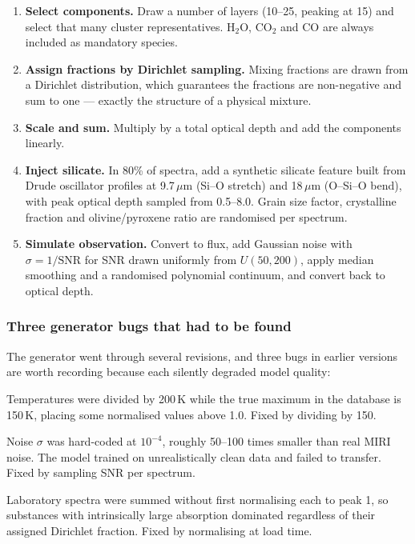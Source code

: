 \documentclass[11pt,a4paper]{article}
\newcommand{\um}{\,$\mu$m}
\newcommand{\htwoo}{H$_2$O}
\newcommand{\cotwo}{CO$_2$}
\begin{document}
\begin{enumerate}
  \item \textbf{Select components.} Draw a number of layers (10--25,
        peaking at 15) and select that many cluster representatives.
        \htwoo, \cotwo{} and CO are always included as mandatory species.
  \item \textbf{Assign fractions by Dirichlet sampling.} Mixing fractions
        are drawn from a Dirichlet distribution, which guarantees the
        fractions are non-negative and sum to one --- exactly the
        structure of a physical mixture.
  \item \textbf{Scale and sum.} Multiply by a total optical depth and add
        the components linearly.
  \item \textbf{Inject silicate.} In 80\% of spectra, add a synthetic
        silicate feature built from Drude oscillator profiles at 9.7\um{}
        (Si--O stretch) and 18\um{} (O--Si--O bend), with peak optical
        depth sampled from 0.5--8.0. Grain size factor, crystalline
        fraction and olivine/pyroxene ratio are randomised per spectrum.
  \item \textbf{Simulate observation.} Convert to flux, add Gaussian noise
        with $\sigma = 1/\text{SNR}$ for SNR drawn uniformly from
        $U(50,200)$, apply median smoothing and a randomised polynomial
        continuum, and convert back to optical depth.
\end{enumerate}

\subsubsection*{Three generator bugs that had to be found}

The generator went through several revisions, and three bugs in earlier
versions are worth recording because each silently degraded model quality:

\begin{description}[style=nextline, leftmargin=0pt, labelindent=0pt, labelwidth=0pt, labelsep=0pt, itemsep=4pt]
  \item[Temperature normalisation.] Temperatures were divided by 200\,K
        while the true maximum in the database is 150\,K, placing some
        normalised values above 1.0. Fixed by dividing by 150.

  \item[Noise too small.] Noise $\sigma$ was hard-coded at $10^{-4}$,
        roughly 50--100 times smaller than real MIRI noise. The model
        trained on unrealistically clean data and failed to transfer.
        Fixed by sampling SNR per spectrum.

  \item[No normalisation before mixing.] Laboratory spectra were summed
        without first normalising each to peak 1, so substances with
        intrinsically large absorption dominated regardless of their
        assigned Dirichlet fraction. Fixed by normalising at load time.
\end{description}
\end{document}
